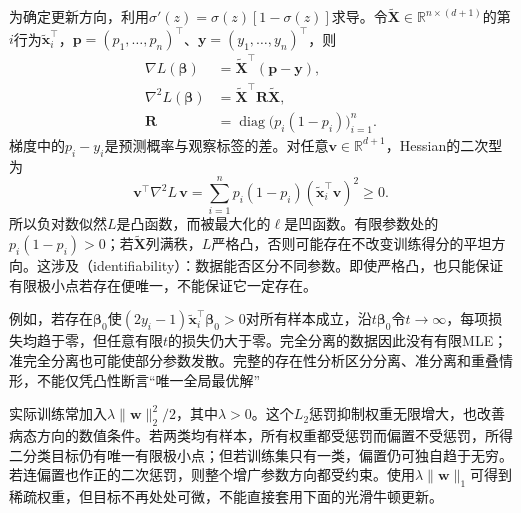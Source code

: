 为确定更新方向，利用$\sigma'(z)=\sigma(z)[1-\sigma(z)]$求导。令$\tilde{\bm{X}}\in\mathbb{R}^{n\times(d+1)}$的第$i$行为$\tilde{\bm{x}}_i^{\top}$，$\bm{p}=(p_1,\ldots,p_n)^{\top}$、$\bm{y}=(y_1,\ldots,y_n)^{\top}$，则
\begin{equation}
  \label{eq:classification-logistic-derivatives}
  \begin{aligned}
    \nabla L(\bm{\beta})
      &=\tilde{\bm{X}}^{\top}(\bm{p}-\bm{y}),\\
    \nabla^2 L(\bm{\beta})
      &=\tilde{\bm{X}}^{\top}\bm{R}\tilde{\bm{X}},\\
    \bm{R}
      &=\operatorname{diag}\bigl(p_i(1-p_i)\bigr)_{i=1}^{n}.
  \end{aligned}
\end{equation}
梯度中的$p_i-y_i$是预测概率与观察标签的差。对任意$\bm{v}\in\mathbb{R}^{d+1}$，Hessian的二次型为
\[
  \bm{v}^{\top}\nabla^2L\,\bm{v}
  =\sum_{i=1}^{n}p_i(1-p_i)
    (\tilde{\bm{x}}_i^{\top}\bm{v})^2\geq0.
\]
所以负对数似然$L$是凸函数，而被最大化的$\ell$是凹函数。有限参数处的$p_i(1-p_i)>0$；若$\tilde{\bm{X}}$列满秩，$L$严格凸，否则可能存在不改变训练得分的平坦方向。这涉及（identifiability）：数据能否区分不同参数。即使严格凸，也只能保证有限极小点若存在便唯一，不能保证它一定存在。

例如，若存在$\bm{\beta}_0$使$(2y_i-1)\tilde{\bm{x}}_i^{\top}\bm{\beta}_0>0$对所有样本成立，沿$t\bm{\beta}_0$令$t\to\infty$，每项损失均趋于零，但任意有限$t$的损失仍大于零。完全分离的数据因此没有有限MLE；准完全分离也可能使部分参数发散。完整的存在性分析区分分离、准分离和重叠情形，不能仅凭凸性断言“唯一全局最优解”

实际训练常加入$\lambda\lVert\bm{w}\rVert_2^2/2$，其中$\lambda>0$。这个$L_2$惩罚抑制权重无限增大，也改善病态方向的数值条件。若两类均有样本，所有权重都受惩罚而偏置不受惩罚，所得二分类目标仍有唯一有限极小点；但若训练集只有一类，偏置仍可独自趋于无穷。若连偏置也作正的二次惩罚，则整个增广参数方向都受约束。使用$\lambda\lVert\bm{w}\rVert_1$可得到稀疏权重，但目标不再处处可微，不能直接套用下面的光滑牛顿更新。

